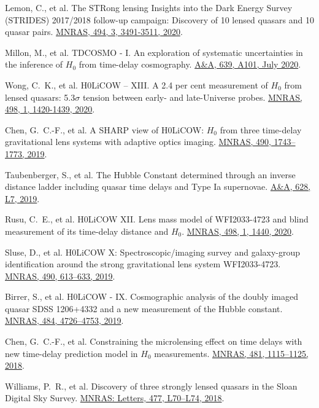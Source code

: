 \documentclass[margin, line]{res}
\begin{document}
\begin{resume}
\begin{etaremune}
	\item Lemon, C., et al. The STRong lensing Insights into the Dark Energy Survey (STRIDES) 2017/2018 follow-up campaign: Discovery of 10 lensed quasars and 10 quasar pairs. \href{https://doi.org/10.1093/mnras/staa652}{MNRAS, 494, 3, 3491-3511, 2020}.
	\item Millon, M., et al. TDCOSMO - I. An exploration of systematic uncertainties in the inference of $H_0$ from time-delay cosmography. \href{https://doi.org/10.1051/0004-6361/201937351}{A\&A, 639, A101, July 2020}.
	\item Wong, C.~K., et al. H0LiCOW -- XIII. A 2.4 per cent measurement of $H_0$ from lensed quasars: 5.3$\sigma$ tension between early- and late-Universe probes. \href{https://doi.org/10.1093/mnras/stz3094}{MNRAS, 498, 1, 1420-1439, 2020}.
	\item Chen, G.~C.-F., et al. A SHARP view of H0LiCOW: $H_0$ from three time-delay gravitational lens systems with adaptive optics imaging. \href{https://academic.oup.com/mnras/article/doi/10.1093/mnras/stz2547/5568378/}{MNRAS, 490, 1743--1773, 2019}.
	\item Taubenberger, S., et al. The Hubble Constant determined through an inverse distance ladder including quasar time delays and Type Ia supernovae. \href{https://www.aanda.org/articles/aa/abs/2019/08/aa35980-19/aa35980-19.html}{A\&A, 628, L7, 2019}.
	\item Rusu, C.~E., et al. H0LiCOW XII. Lens mass model of WFI2033-4723 and blind measurement of its time-delay distance and $H_0$. \href{https://ui.adsabs.harvard.edu/abs/2020MNRAS.498.1440R/abstract}{MNRAS, 498, 1, 1440, 2020}.
	\item Sluse, D., et al. H0LiCOW X: Spectroscopic/imaging survey and galaxy-group identification around the strong gravitational lens system WFI2033-4723. \href{https://academic.oup.com/mnras/article/doi/10.1093/mnras/stz2483/5561514/}{MNRAS, 490, 613--633, 2019}.
	\item Birrer, S., et al. H0LiCOW - IX. Cosmographic analysis of the doubly imaged quasar SDSS 1206+4332 and a new measurement of the Hubble constant. \href{https://doi.org/10.1093/mnras/stz200}{MNRAS, 484, 4726--4753, 2019}.
	\item Chen, G.~C.-F., et al. Constraining the microlensing effect on time delays with new time-delay prediction model in $H_0$ measurements. \href{https://doi.org/10.1093/mnras/sty2350}{MNRAS, 481, 1115--1125, 2018}.
 	\item Williams, P.~R., et al. Discovery of three strongly lensed quasars in the Sloan Digital Sky Survey. \href{https://doi.org/10.1093/mnrasl/sly043}{MNRAS: Letters, 477, L70--L74, 2018}.
\end{etaremune}


\end{resume}
\end{document}
